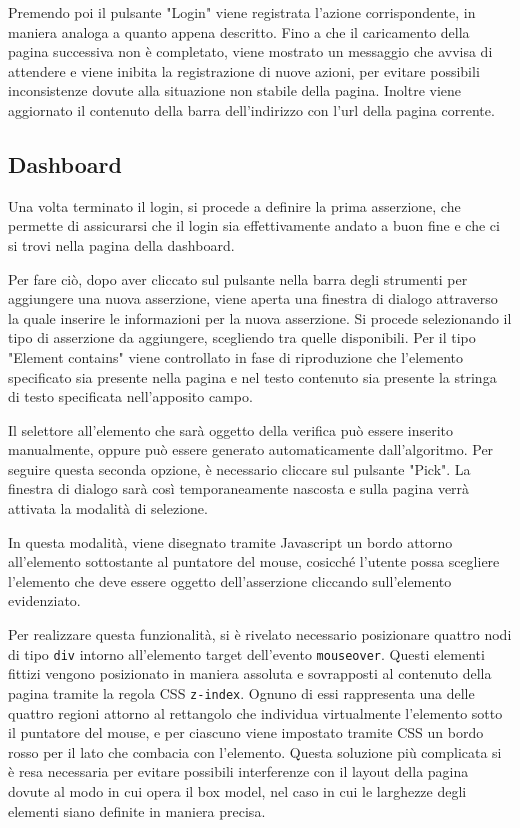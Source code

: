 Premendo poi il pulsante "Login" viene registrata l'azione corrispondente, in maniera analoga a quanto appena descritto. Fino a che il caricamento della pagina successiva non è completato, viene mostrato un messaggio che avvisa di attendere e viene inibita la registrazione di nuove azioni, per evitare possibili inconsistenze dovute alla situazione non stabile della pagina. Inoltre viene aggiornato il contenuto della barra dell'indirizzo con l'url della pagina corrente.

\subsection{Dashboard}

Una volta terminato il login, si procede a definire la prima asserzione, che permette di assicurarsi che il login sia effettivamente andato a buon fine e che ci si trovi nella pagina della dashboard. 

Per fare ciò, dopo aver cliccato sul pulsante nella barra degli strumenti per aggiungere una nuova asserzione, viene aperta una finestra di dialogo attraverso la quale inserire le informazioni per la nuova asserzione. Si procede selezionando il tipo di asserzione da aggiungere, scegliendo tra quelle disponibili. Per il tipo "Element contains" viene controllato in fase di riproduzione che l'elemento specificato sia presente nella pagina e nel testo contenuto sia presente la stringa di testo specificata nell'apposito campo.

Il selettore all'elemento che sarà oggetto della verifica può essere inserito manualmente, oppure può essere generato automaticamente dall'algoritmo. Per seguire questa seconda opzione, è necessario cliccare sul pulsante "Pick". La finestra di dialogo sarà così temporaneamente nascosta e sulla pagina verrà attivata la modalità di selezione. 

In questa modalità, viene disegnato tramite Javascript un bordo attorno all'elemento sottostante al puntatore del mouse, cosicché l'utente possa scegliere l'elemento che deve essere oggetto dell'asserzione cliccando sull'elemento evidenziato.

Per realizzare questa funzionalità, si è rivelato necessario posizionare quattro nodi di tipo \verb|div| intorno all'elemento target dell'evento \verb|mouseover|. Questi elementi fittizi vengono posizionato in maniera assoluta e sovrapposti al contenuto della pagina tramite la regola CSS \verb|z-index|. Ognuno di essi rappresenta una delle quattro regioni attorno al rettangolo che individua virtualmente l'elemento sotto il puntatore del mouse, e per ciascuno viene impostato tramite CSS un bordo rosso per il lato che combacia con l'elemento. Questa soluzione più complicata si è resa necessaria per evitare possibili interferenze con il layout della pagina dovute al modo in cui opera il box model, nel caso in cui le larghezze degli elementi siano definite in maniera precisa.

